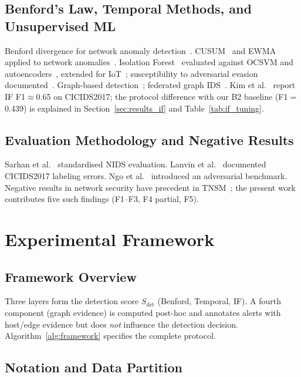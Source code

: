 \documentclass[journal,10pt,twoside]{IEEEtran}
\newcommand{\sdet}{$S_{\mathrm{det}}$}
\begin{document}
\subsection{Benford's Law, Temporal Methods, and Unsupervised ML}
Benford divergence for network anomaly
detection~\cite{mbona2023benford,campanelli2023euclidean,benford1938,nigrini2023benford,wiryadinata2023multi,xu2023benford}.
CUSUM~\cite{page1954cusum} and EWMA~\cite{roberts1959ewma} applied
to network anomalies~\cite{pliu2023cusum,chen2023ewma}.
Isolation Forest~\cite{liu2008iforest} evaluated against OCSVM and
autoencoders~\cite{kim2023unsupervised}, extended for
IoT~\cite{zhang2024adaptive}; susceptibility to adversarial evasion
documented~\cite{chen2023adversarial}.
Graph-based
detection~\cite{lo2023egraphsage,siddiqui2024dynamic}; federated
graph IDS~\cite{li2024fedgnids}.
Kim et al.~\cite{kim2023unsupervised} report IF
F1$\approx$0.65 on CICIDS2017; the protocol difference with our B2
baseline (F1$=$0.439) is explained in Section~\ref{sec:results_if}
and Table~\ref{tab:if_tuning}.

\subsection{Evaluation Methodology and Negative Results}
Sarhan et al.~\cite{sarhan2023standardised} standardised NIDS
evaluation.
Lanvin et al.~\cite{lanvin2024errors} documented CICIDS2017
labeling errors.
Ngo et al.~\cite{ngo2023adversarial} introduced an adversarial
benchmark.
Negative results in network security have precedent in
TNSM~\cite{lanvin2024errors}; the present work contributes five
such findings (F1--F3, F4 partial, F5).

\section{Experimental Framework}
\label{sec:framework}

\subsection{Framework Overview}
Three layers form the detection score \sdet{}
(Benford, Temporal, IF).  A fourth component (graph evidence) is
computed post-hoc and annotates alerts with host/edge evidence but
does \emph{not} influence the detection decision.
Algorithm~\ref{alg:framework} specifies the complete protocol.

\subsection{Notation and Data Partition}
\end{document}
